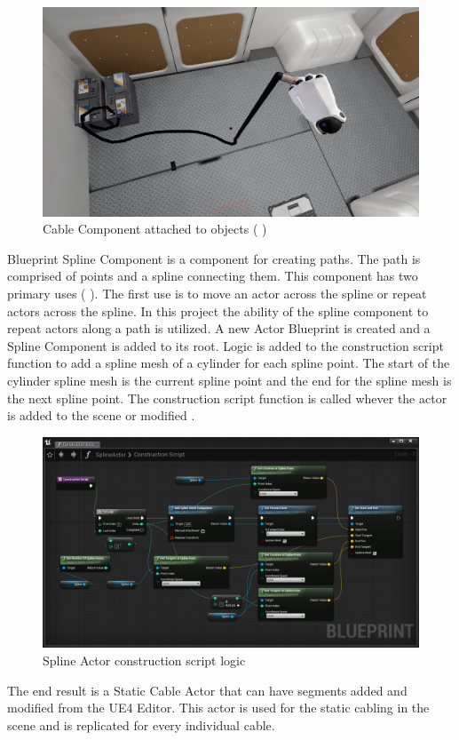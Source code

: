\documentclass[12pt, a4paper,oneside, nocenter]{thesis}
\renewcommand{\citeyearpar}[1]{(\citeauthor{#1} \citeyear{#1})}
\newcommand{\citeyeartitlexamkinline}[1]{(\usebibentry{#1}{title} \citeyear{#1})}
\begin{document}
\begin{figure}[H]
	\includegraphics[width=\textwidth]{cable-grab}
	\caption{Cable Component attached to objects \citeyearpar{obsas-assets}}
	\label{fig:cable-grab}
\end{figure}
Blueprint Spline Component is a component for creating paths. The path is comprised of points and a spline connecting them. This component has two primary uses \citeyeartitlexamkinline{spline-component}. The first use is to move an actor across the spline or repeat actors across the spline. In this project the ability of the spline component to repeat actors along a path is utilized. A new Actor Blueprint is created and a Spline Component is added to its root. Logic is added to the construction script function to add a spline mesh of a cylinder for each spline point. The start of the cylinder spline mesh is the current spline point and the end for the spline mesh is the next spline point. The construction script function is called whever the actor is added to the scene or modified . 
\begin{figure}[H]
	\includegraphics[width=\textwidth]{spline-component}
	\caption{Spline Actor construction script logic}
	\label{fig:spline-component}
\end{figure}
The end result is a Static Cable Actor that can have segments added and modified from the UE4 Editor. This actor is used for the static cabling in the scene and is replicated for every individual cable.
\end{document}
